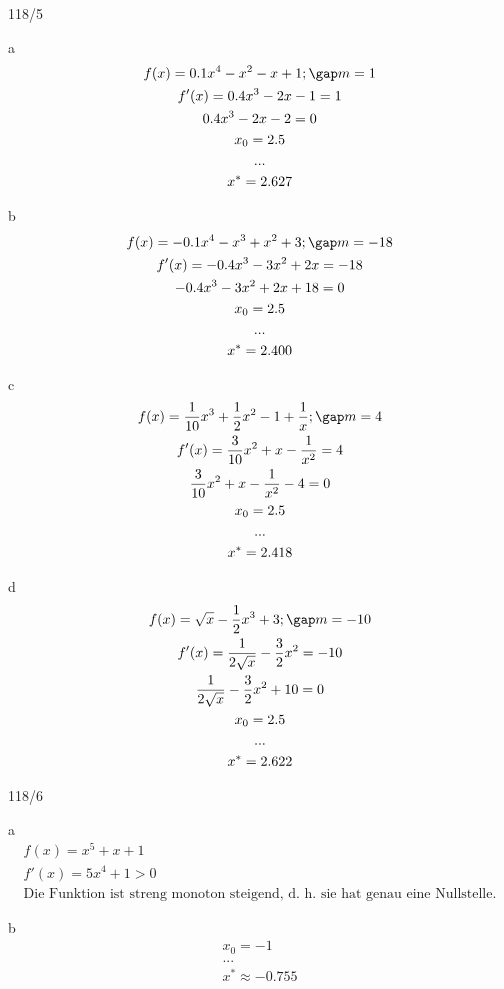 \newpage
\begin{exercise}{118/5}
  \item [a]
  \begin{gather*}
    f(x) = 0.1x^4 - x^2 - x + 1; \gap m = 1 \\
    f'(x) = 0.4x^3 - 2x - 1 = 1 \\
    0.4x^3 - 2x - 2 = 0 \\
    x_0 = 2.5 \\
    ... \\
    x^\ast = 2.627
  \end{gather*}
  \item [b]
  \begin{gather*}
    f(x) = -0.1x^4 - x^3 + x^2 + 3; \gap m = -18 \\
    f'(x) = -0.4x^3 - 3x^2 + 2x = -18 \\
    -0.4x^3 - 3x^2 + 2x + 18 = 0 \\
    x_0 = 2.5 \\
    ... \\
    x^\ast = 2.400
  \end{gather*}
  \item [c]
  \begin{gather*}
    f(x) = \frac{1}{10}x^3 + \frac{1}{2}x^2 - 1 + \frac{1}{x}; \gap m = 4 \\
    f'(x) = \frac{3}{10}x^2 + x - \frac{1}{x^2} = 4 \\
    \frac{3}{10}x^2 + x - \frac{1}{x^2} - 4 = 0 \\
    x_0 = 2.5 \\
    ... \\
    x^\ast = 2.418
  \end{gather*}
  \item [d]
  \begin{gather*}
    f(x) = \sqrt{x} - \frac{1}{2}x^3 + 3; \gap m = -10 \\
    f'(x) = \frac{1}{2 \sqrt{x}} - \frac{3}{2}x^2 = -10 \\
    \frac{1}{2 \sqrt{x}} - \frac{3}{2}x^2 + 10 = 0 \\
    x_0 = 2.5 \\
    ... \\
    x^\ast = 2.622
  \end{gather*}
\end{exercise}
\begin{exercise}{118/6}
  \item [a]
  \begin{gather*}
    f(x) = x^5 + x + 1 \\
    f'(x) = 5x^4 + 1 > 0 \\
    \text{Die Funktion ist streng monoton steigend, d. h. sie hat genau eine Nullstelle.}
  \end{gather*}
  \item [b]
  \begin{gather*}
    x_0 = -1 \\
    ... \\
    x^\ast \approx -0.755
  \end{gather*}
\end{exercise}
